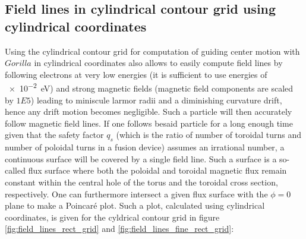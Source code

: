 \documentclass[./main.tex]{subfiles}
\begin{document}
\subsection{Field lines in cylindrical contour grid using cylindrical coordinates}
Using the cylindrical contour grid for computation of guiding center motion with $Gorilla$ in cylindrical coordinates also allows to easily compute field lines by following electrons at very low energies (it is sufficient to use energies of \SI[prefixes-as-symbols=false]{e-2}{eV}) and strong magnetic fields (magnetic field components are scaled by $1E5$) leading to miniscule larmor radii and a diminishing curvature drift, hence any drift motion becomes negligible. Such a particle will then accurately follow magnetic field lines. If one follows besaid particle for a long enough time given that the safety factor $q_s$ (which is the ratio of number of toroidal turns and number of poloidal turns in a fusion device) assumes an irrational number, a continuous surface will be covered by a single field line. Such a surface is a so-called flux surface where both the poloidal and toroidal magnetic flux remain constant within the central hole of the torus and the toroidal cross section, respectively. One can furthermore intersect a given flux surface with the $\phi=0$ plane to make a Poincar\'e plot. Such a plot, calculated using cylindrical coordinates, is given for the cyldrical contour grid in figure \ref{fig:field_lines_rect_grid} and \ref{fig:field_lines_fine_rect_grid}:
\end{document}
